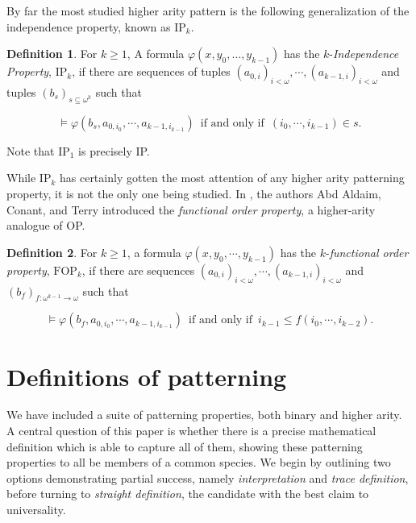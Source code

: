 \documentclass{article}
\newcommand{\IFF}{\enspace\text{if and only if}\enspace}
\newcommand{\vphi}{\varphi}
\theoremstyle{definition}
\newtheorem{definition}{Definition}
\theoremstyle{definition}
\theoremstyle{definition}
\begin{document}
By far the most studied higher arity pattern is the following generalization of the independence property, known as $\text{IP}_k$.

\begin{definition}\label{IPk definition}
    For $k\geq 1$, A formula $\vphi(x, y_0, \dots, y_{k-1})$ has the $k$-\textit{Independence Property}, $\text{IP}_k$, if there are sequences of tuples $(a_{0,i})_{i<\omega},\dotsm, (a_{k-1,i})_{i< \omega}$ and tuples $(b_s)_{s\subseteq\omega^k}$ such that 

    \[\models \vphi(b_s, a_{0,i_0},\dotsm, a_{k-1,i_{k-1}})\IFF (i_0, \dotsm ,i_{k-1})\in s.\]


    
\end{definition}

Note that $\text{IP}_1$ is precisely IP. 

While $\text{IP}_k$ has certainly gotten the most attention of any higher arity patterning property, it is not the only one being studied. In \cite{abd2025higher}, the authors Abd Aldaim, Conant, and Terry introduced the \textit{functional order property}, a higher-arity analogue of OP.

\begin{definition}\label{FOPk defn}
    For $k\geq 1$, a formula $\vphi(x, y_0,\dotsm, y_{k-1})$ has the $k$-\textit{functional order property}, $\text{FOP}_k$, if there are sequences $(a_{0,i})_{i<\omega},\dotsm, (a_{k-1,i})_{i < \omega}$ and $(b_f)_{f\colon \omega^{k-1}\to\omega}$ such that 

    \[\models \vphi (b_f, a_{0,i_0},\dotsm, a_{k-1,i_{k-1}})\IFF i_{k-1}\leq f(i_0,\dotsm, i_{k-2}).\]

\end{definition}


\section{Definitions of patterning}\label{Definitions of patterning}

We have included a suite of patterning properties, both binary and higher arity. A central question of this paper is whether there is a precise mathematical definition which is able to capture all of them, showing these patterning properties to all be members of a common species. We begin by outlining two options demonstrating partial success, namely \textit{interpretation} and \textit{trace definition}, before turning to \textit{straight definition}, the candidate with the best claim to universality.
\end{document}
